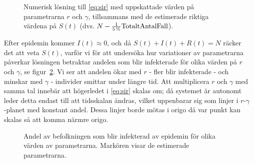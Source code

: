 \documentclass{article}
\begin{document}
\begin{figure}
	\centering
	\caption{Numerisk lösning till \eqref{eq:sir} med uppskattade värden på parametrarna $r$ och $\gamma$,
	tillsammans med de estimerade riktiga värdena på $S(t)$
	(dvs. $N - \frac1{\SI5\percent} \text{TotaltAntalFall}$). \label{fig:sir_solution}}
\end{figure}

Efter epidemin kommer $I(t) \approx 0$,
och då $S(t) + I(t) + R(t) = N$
räcker det att veta $S(t)$,
varför vi för att undersöka hur variationer av parametrarna påverkar lösningen
betraktar andelen som blir infekterade för olika värden på $r$ och $\gamma$,
se figur~\ref{fig:param_variation}.
Vi ser att andelen ökar med $r$ - fler blir infekterade -
och minskar med $\gamma$ - individer smittar under längre tid.
Att multiplicera $r$ och $\gamma$ med samma tal innebär att
högerledet i \eqref{eq:sir} skalas om;
då systemet är autonomt leder detta endast till att
tidsskalan ändras,
vilket uppenbarar sig som linjer i $r$\nobreakdash-$\gamma$\nobreakdash-planet
med konstant andel.
Dessa linjer borde mötas i origo då var punkt kan skalas
så att komma närmre origo.

\begin{figure}
	\centering
	\caption{Andel av befolkningen som blir infekterad av epidemin
	för olika värden av parametrarna.
	Markören visar de estimerade parametrarna. \label{fig:param_variation}}
\end{figure}
\end{document}
